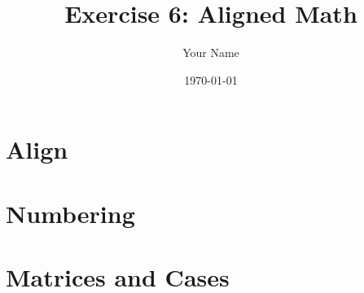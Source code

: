 \documentclass{article}
\title{Exercise 6: Aligned Math}
\author{Your Name}
\date{\today}
\begin{document}
\maketitle

\section{Align}

\section{Numbering}

\section{Matrices and Cases}
\end{document}
